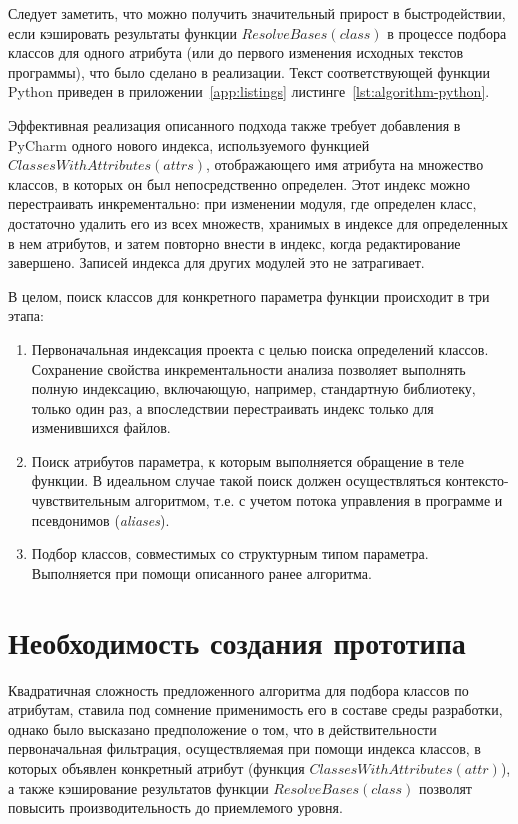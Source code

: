 Следует заметить, что можно получить значительный прирост в быстродействии, если
кэшировать результаты функции $ResolveBases(class)$ в процессе подбора классов
для одного атрибута (или до первого изменения исходных текстов программы), что
было сделано в реализации. Текст соответствующей функции Python приведен в
приложении~\ref{app:listings} листинге~\ref{lst:algorithm-python}.

Эффективная реализация описанного подхода также требует добавления в PyCharm одного нового
индекса, используемого функцией $ClassesWithAttributes(attrs)$, отображающего
имя атрибута на множество классов, в которых он был непосредственно определен.
Этот индекс можно перестраивать инкрементально: при изменении модуля, где
определен класс, достаточно удалить его из всех множеств, хранимых в индексе для
определенных в нем атрибутов, и затем повторно внести в индекс, когда
редактирование завершено. Записей индекса для других модулей это не затрагивает.

В целом, поиск классов для конкретного параметра функции происходит в три этапа:

\begin{enumerate}
    \item Первоначальная индексация проекта с целью поиска определений классов.
      Сохранение свойства инкрементальности анализа позволяет выполнять полную
      индексацию, включающую, например, стандартную библиотеку, только один раз,
      а впоследствии перестраивать индекс только для изменившихся файлов.

    \item Поиск атрибутов параметра, к которым выполняется обращение в теле
      функции. В идеальном случае такой поиск должен осуществляться
      контексто-чувствительным алгоритмом, т.е. с учетом потока управления в
      программе и псевдонимов (\emph{aliases}).

    \item Подбор классов, совместимых со структурным типом параметра.
      Выполняется при помощи описанного ранее алгоритма.

  \end{enumerate}


\section{Необходимость создания прототипа}
\label{sec:prototype-necessity}

Квадратичная сложность предложенного алгоритма для подбора классов по атрибутам,
ставила под сомнение применимость его в составе среды разработки, однако было
высказано предположение о том, что в действительности первоначальная фильтрация,
осуществляемая при помощи индекса классов, в которых объявлен конкретный
атрибут (функция $ClassesWithAttributes(attr)$), а также кэширование результатов
функции $ResolveBases(class)$ позволят повысить производительность до
приемлемого уровня.

